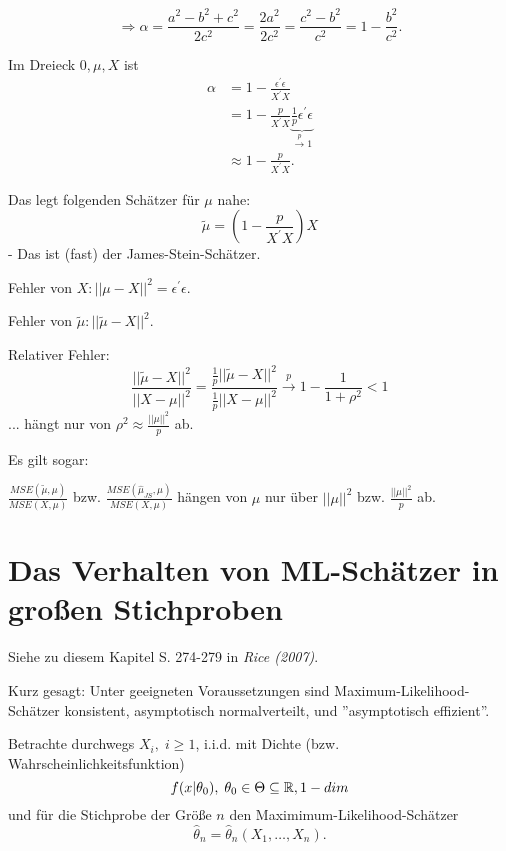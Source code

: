 \documentclass{tstextbook}
\begin{document}
	\[ \Rightarrow \alpha = \frac{a^2-b^2+c^2}{2c^2} = \frac{2a^2}{2c^2} = \frac{c^2-b^2}{c^2} = 1 - \frac{b^2}{c^2} . \] 
	
	Im Dreieck $ 0,\mu,X $ ist 
	\[
	\begin{aligned}
		\alpha & = 1- \frac{\epsilon^\prime\epsilon}{X^\prime X} \\
		& = 1 - \frac{p}{X^\prime X}\underbrace{\frac{1}{p}\epsilon^\prime\epsilon}_{\xrightarrow{p} 1} \\
		& \approx 1- \frac{p}{X^\prime X}.
	\end{aligned}
	\]
	
	Das legt folgenden Schätzer für $ \mu $ nahe:
	\[
	\tilde{\mu} = \left(1-\frac{p}{X^\prime X}\right)X
	\]
	- Das ist (fast) der James-Stein-Schätzer. 
	
	Fehler von $ X\colon ||\mu-X||^2 = \epsilon^\prime \epsilon $. 
	
	Fehler von $ \tilde{\mu}  \colon ||\tilde{\mu} -X||^2 $. 
	
	Relativer Fehler: 
	\[
	\frac{||\tilde{\mu}-X||^2}{||X-\mu||^2} = \frac{\frac{1}{p}||\tilde{\mu}-X||^2}{\frac{1}{p}||X-\mu||^2} \xrightarrow{p} 1-\frac{1}{1+\rho^2} < 1
	\]
	... hängt nur von $ \rho^2  \approx \frac{||\mu||^2}{p} $ ab.
	
	Es gilt sogar:
	
	$ \frac{MSE(\tilde{\mu},\mu)}{MSE(X,\mu)} $ bzw. 	$ \frac{MSE(\hat{\mu}_{JS},\mu)}{MSE(X,\mu)} $ hängen von $ \mu $ nur über $ ||\mu||^2 $ bzw. $ \frac{||\mu||^2}{p} $ ab.
	
	
	\section{Das Verhalten von ML-Schätzer in großen Stichproben}
	
	\begin{book} 
		Siehe zu diesem Kapitel S. 274-279 in	\textit{Rice (2007)}.
	\end{book}
	
	Kurz gesagt: Unter geeigneten Voraussetzungen sind Maximum-Likelihood-Schätzer konsistent, asymptotisch normalverteilt, und ''asymptotisch effizient''.
	
	Betrachte durchwegs $ X_i, \; i \ge 1 $, i.i.d. mit Dichte (bzw. Wahrscheinlichkeitsfunktion)
	\[
	f(x|\theta_0), \; \theta_0\in\Theta\subseteq\mathbb R, 1-dim
	\] 
	und für die Stichprobe der Größe $ n $ den Maximimum-Likelihood-Schätzer 
	\[
	\hat{\theta}_n = \hat{\theta}_n\left(X_1,\ldots,X_n\right).
	\]
	
\end{document}
